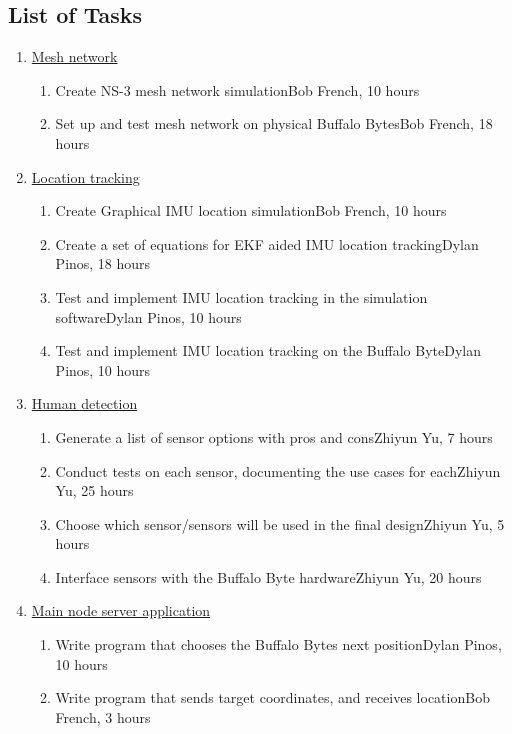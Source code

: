\documentclass[10pt]{article}
\begin{document}
\subsection*{List of Tasks}
\begin{enumerate}
	\item\underline{Mesh network}
	\begin{enumerate}[label=1.\arabic*]
		\item Create NS-3 mesh network simulation\hfill Bob French, 10 hours
		\item Set up and test mesh network on physical Buffalo Bytes\hfill Bob French, 18 hours
	\end{enumerate}
	\item\underline{Location tracking}
	\begin{enumerate}[label=2.\arabic*]
		\item Create Graphical IMU location simulation\hfill Bob French, 10 hours
		\item Create a set of equations for EKF aided IMU location tracking\hfill Dylan Pinos, 18 hours
		\item Test and implement IMU location tracking in the simulation software\hfill Dylan Pinos, 10 hours
		\item Test and implement IMU location tracking on the Buffalo Byte\hfill Dylan Pinos, 10 hours
	\end{enumerate}
	\item\underline{Human detection}
	\begin{enumerate}[label=3.\arabic*]
		\item Generate a list of sensor options with pros and cons\hfill Zhiyun Yu, 7 hours
		\item Conduct tests on each sensor, documenting the use cases for each\hfill Zhiyun Yu, 25 hours
		\item Choose which sensor/sensors will be used in the final design\hfill Zhiyun Yu, 5 hours
		\item Interface sensors with the Buffalo Byte hardware\hfill Zhiyun Yu, 20 hours
	\end{enumerate}
	\item\underline{Main node server application}
	\begin{enumerate}[label=4.\arabic*]
		\item Write program that chooses the Buffalo Bytes next position\hfill Dylan Pinos, 10 hours
		\item Write program that sends target coordinates, and receives location\hfill Bob French, 3 hours

\end{enumerate}
\end{enumerate}
\end{document}
